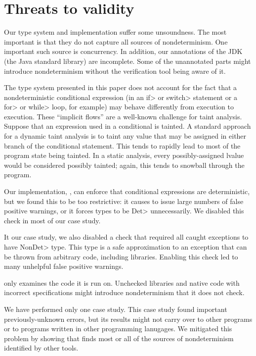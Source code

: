\section{Threats to validity}\label{sec:threats}

Our type system and implementation suffer some unsoundness.  The most
important is that they do not capture all sources of nondeterminism.  One
important such source is concurrency.
%
In addition, our annotations of the JDK (the Java standard library) are incomplete.
Some of the unannotated parts might introduce nondeterminism without
the verification tool being aware of it.

The type system presented in this paper does not account for the fact that
a nondeterministic conditional expression (in an \<if> or \<switch>
statement or a \<for> or \<while> loop, for example) may behave differently
from execution to execution.
These ``implicit flows'' are a well-known challenge for taint analysis.
Suppose that an expression used in a conditional is tainted.
A standard approach for a dynamic taint analysis is to taint any value that may
be assigned in either branch of the conditional statement.  This tends to rapidly lead to most of
the program state being tainted.
In a static analysis, every possibly-assigned lvalue would be considered
possibly tainted; again, this tends to snowball through the program.

Our implementation, \theDeterminismChecker, can enforce that conditional
expressions are deterministic, but we found this to be too restrictive:  it
causes \theDeterminismChecker to issue large numbers of false positive
warnings, or it forces types to be \<Det> unnecessarily.
We disabled this check in most of our case study.

It our case study, we also disabled a check that required all caught
exceptions to have \<NonDet> type.  This type is a safe approximation to an
exception that can be thrown from arbitrary code, including libraries.
Enabling this check led to many unhelpful false positive warnings.


\TheDeterminismChecker only examines the code it is run on.  Unchecked
libraries and native code with incorrect specifications might introduce
nondeterminism that it does not check.


We have performed only one case study.  This case study found important
previously-unknown errors, but its results might not carry over to other
programs or to programs written in other programming lanugages.  We
mitigated this problem by showing that \theDeterminismChecker finds most or
all of the sources of nondeterminism identified by other tools.
